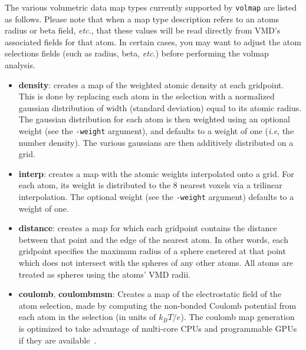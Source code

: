 The various volumetric data map types currently supported by {\tt volmap} are
listed as follows. Please note that when a map type description refers to an atoms radius
or beta field, \emph{etc.}, that these values will be read directly from VMD's
associated fields for that atom. In certain cases, you may want to adjust the
atom selections fields (such as radius, beta, \emph{etc.}) before performing the
volmap analysis.
\begin{itemize} 

  \item {\bf density}: creates a map of the weighted atomic density at each
  gridpoint. This is done by replacing each atom in the selection with a
  normalized gaussian distribution of width (standard deviation) equal to its
  atomic radius. The gaussian distribution for each atom is then weighted using
  an optional weight (see the {\tt -weight} argument), and defaults to a weight
  of one (\emph{i.e}, the number density). The various gaussians are then
  additively distributed on a grid. 

  \item {\bf interp}: creates a map with the atomic weights interpolated
  onto a grid. For each atom, its weight is distributed to the 8 nearest 
  voxels via a trilinear interpolation. The optional weight (see the
  {\tt -weight} argument) defaults to a weight of one.

  \item {\bf distance}: creates a map for which each gridpoint contains the
  distance between that point and the edge of the nearest atom. In other words,
  each gridpoint specifies the maximum radius of a sphere cnetered at that point
  which does not intersect with the spheres of any other atoms. All atoms are
  treated as spheres using the atoms' VMD radii.

  
  \item {\bf coulomb}, {\bf coulombmsm}: Creates a map of the electrostatic 
  field of the atom selection, made by computing the 
  non-bonded Coulomb potential from each atom in the selection 
  (in units of $k_BT/e$). The coulomb map generation is optimized to 
  take advantage of multi-core CPUs and programmable GPUs if they are 
  available~\cite{STON2007,OWEN2008-JS,RODR2008,HARD2009,KIND2009-JS,STON2010,STON2010-JS,ENOS2010-JP,STON2011}.
  

\end{itemize}
